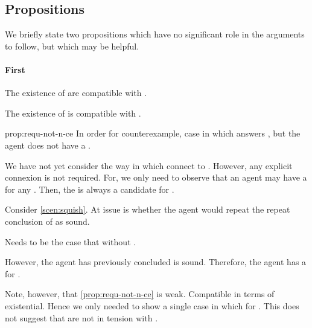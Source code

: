 

\subsection{Propositions}
\label{sec:propsoitions}

\begin{note}
  We briefly state two propositions which have no significant role in the arguments to follow, but which may be helpful.
\end{note}

\paragraph*{First}

\begin{note}
  The existence of  are compatible with \issueConstraint{}.
  \begin{proposition}
    \label{prop:requ-not-n-ce}
    The existence of  is compatible with \issueConstraint{}.
  \end{proposition}
  \begin{argument}{prop:requ-not-n-ce}
    In order for counterexample, case in which \ros{} answers \qWhyV{}, but the agent does not have a \wit{}.

    We have not yet consider the way in which  connect to \qWhyV{}.
    However, any explicit connexion is not required.
    For, we only need to observe that an agent may have a \wit{} for any \requ{}.
    Then, the \wit{} is always a candidate for \qHowV{}.

    Consider \autoref{scen:squish}.
    At issue is whether the agent would repeat the repeat conclusion of \sqE{} as sound.

    Needs to be the case that \ros{} without \wit{}.

    However, the agent has previously concluded \sqE{} is sound.
    Therefore, the agent has a \wit{} for \ros{}.
  \end{argument}

  Note, however, that \autoref{prop:requ-not-n-ce} is weak.
  Compatible in terms of existential.
  Hence we only needed to show a single case in which \wit{} for \requ{}.
  This does not suggest that  are not in tension with \issueConstraint{}.
\end{note}

